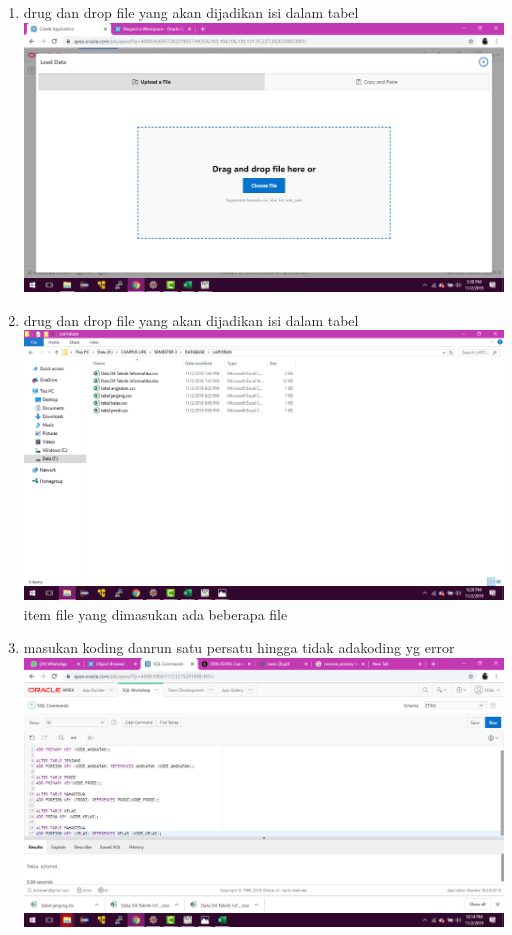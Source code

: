 \begin{enumerate}
\item drug dan drop file yang akan dijadikan isi dalam tabel\\
\includegraphics[scale= 0.3]{gambar/7.png}\\
\item drug dan drop file yang akan dijadikan isi dalam tabel\\
\includegraphics[scale= 0.3]{gambar/8.png}\\
item file yang dimasukan ada beberapa file\\
\item masukan koding danrun satu persatu hingga tidak adakoding yg error\\
\includegraphics[scale= 0.3]{gambar/9.png}\\

\end{enumerate}
